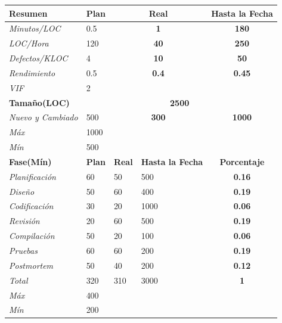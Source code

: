 \documentclass[a4paper,12pt,openany,oneside]{book}
\begin{document}
\begin{tabular}{| l | l | l | l | l | l |}
\hline
\textbf{Resumen} & \textbf{Plan} & \multicolumn{2}{|c|}{\textbf{Real}} & \multicolumn{2}{|c|}{\textbf{Hasta la Fecha}} \\
\hline
\textit{Minutos/LOC} & 0.5 & \multicolumn{2}{|c|}{\textbf{1}} & \multicolumn{2}{|c|}{\textbf{180}} \\
\hline
\textit{LOC/Hora} & 120 & \multicolumn{2}{|c|}{\textbf{40}} & \multicolumn{2}{|c|}{\textbf{250}} \\
\hline
\textit{Defectos/KLOC} & 4 & \multicolumn{2}{|c|}{\textbf{10}} & \multicolumn{2}{|c|}{\textbf{50}} \\
\hline
\textit{Rendimiento} & 0.5 & \multicolumn{2}{|c|}{\textbf{0.4}} & \multicolumn{2}{|c|}{\textbf{0.45}} \\
\hline
\textit{VIF} & 2 & \multicolumn{2}{|c|}{\textbf{}} & \multicolumn{2}{|c|}{\textbf{}} \\
\hline
\textbf{Tamaño(LOC)} & \multicolumn{5}{|c|}{\textbf{2500}}\\
\hline
\textit{Nuevo y Cambiado} & 500 & \multicolumn{2}{|c|}{\textbf{300}} & \multicolumn{2}{|c|}{\textbf{1000}} \\
\hline
\textit{Máx} & 1000 & \multicolumn{4}{|c|}{\textbf{}}\\
\hline
\textit{Mín} & 500  & \multicolumn{4}{|c|}{\textbf{}}\\
\hline
\textbf{Fase(Mín)} & \textbf{Plan} & \textbf{Real} & \textbf{Hasta la Fecha} & \multicolumn{2}{|c|}{\textbf{Porcentaje}} \\
\hline
\textit{Planificación} & 60 & 50  & 500  & \multicolumn{2}{|c|}{\textbf{0.16}}\\
\hline
\textit{Diseño} &        50 & 60  & 400  & \multicolumn{2}{|c|}{\textbf{0.19}}\\
\hline
\textit{Codificación} &  30 & 20  & 1000 & \multicolumn{2}{|c|}{\textbf{0.06}}\\
\hline
\textit{Revisión} &      20 & 60  & 500  & \multicolumn{2}{|c|}{\textbf{0.19}}\\
\hline
\textit{Compilación} &   50 & 20  & 100  & \multicolumn{2}{|c|}{\textbf{0.06}}\\
\hline
\textit{Pruebas} &       60 & 60  & 200  & \multicolumn{2}{|c|}{\textbf{0.19}}\\
\hline
\textit{Postmortem} &    50 & 40  & 200  & \multicolumn{2}{|c|}{\textbf{0.12}}\\
\hline
\textit{Total} &		320 & 310 & 3000 & \multicolumn{2}{|c|}{\textbf{1}}\\
\hline
\textit{Máx} & 			400	& \multicolumn{4}{|c|}{\textbf{}}\\
\hline
\textit{Mín} & 			200 & \multicolumn{4}{|c|}{\textbf{}}\\
\hline
\end{tabular}
\end{document}
